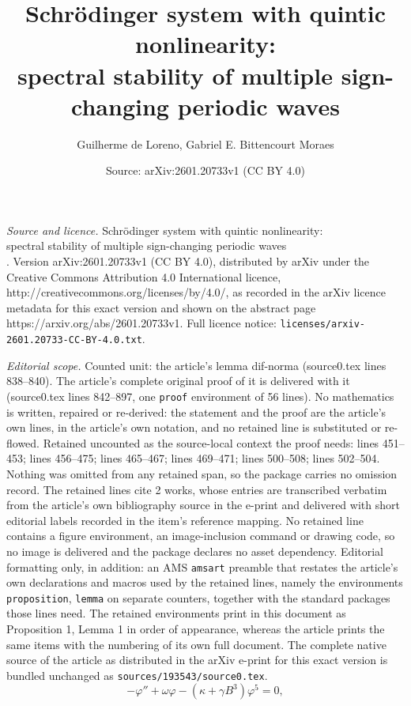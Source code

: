 \documentclass[10pt,a4paper]{amsart}
\title{Schrödinger system with quintic nonlinearity: \\ spectral stability of multiple sign-changing periodic waves \\ \vspace{0.2cm}}
\author{Guilherme de Loreno, Gabriel E. Bittencourt Moraes}
\date{Source: arXiv:2601.20733v1 (CC BY 4.0)}
\begin{document}
\maketitle

\noindent\emph{Source and licence.} Schrödinger system with quintic nonlinearity: \\ spectral stability of multiple sign-changing periodic waves \\ \vspace{0.2cm}. Version arXiv:2601.20733v1 (CC BY 4.0), distributed by arXiv under the Creative Commons Attribution 4.0 International licence, http://creativecommons.org/licenses/by/4.0/, as recorded in the arXiv licence metadata for this exact version and shown on the abstract page https://arxiv.org/abs/2601.20733v1. Full licence notice: \texttt{licenses/arxiv-2601.20733-CC-BY-4.0.txt}.\par\smallskip

\noindent\textit{Editorial scope.} Counted unit: the article's lemma dif-norma (source0.tex lines 838--840). The article's complete original proof of it is delivered with it (source0.tex lines 842--897, one \texttt{proof} environment of 56 lines). No mathematics is written, repaired or re-derived: the statement and the proof are the article's own lines, in the article's own notation, and no retained line is substituted or re-flowed.  Retained uncounted as the source-local context the proof needs: lines 451--453; lines 456--475; lines 465--467; lines 469--471; lines 500--508; lines 502--504.  Nothing was omitted from any retained span, so the package carries no omission record.  The retained lines cite 2 works, whose entries are transcribed verbatim from the article's own bibliography source in the e-print and delivered with short editorial labels recorded in the item's reference mapping.  No retained line contains a figure environment, an image-inclusion command or drawing code, so no image is delivered and the package declares no asset dependency.  Editorial formatting only, in addition: an AMS \texttt{amsart} preamble that restates the article's own declarations and macros used by the retained lines, namely the environments \texttt{proposition}, \texttt{lemma} on separate counters, together with the standard packages those lines need.  The retained environments print in this document as Proposition 1, Lemma 1 in order of appearance, whereas the article prints the same items with the numbering of its own full document.  The complete native source of the article as distributed in the arXiv e-print for this exact version is bundled unchanged as \texttt{sources/193543/source0.tex}.
\begin{equation}\label{mainEDOquinticsystem}
	-\varphi''+\omega \varphi -(\kappa+\gamma B^3)\varphi^5=0,
\end{equation}
\end{document}
